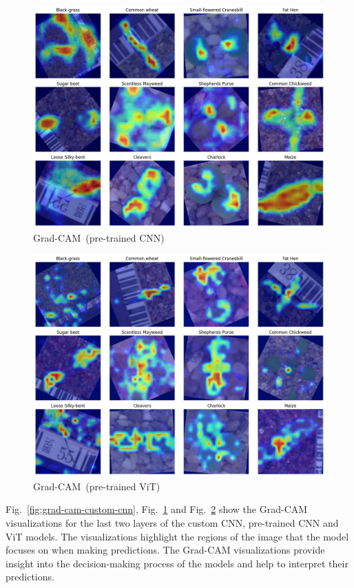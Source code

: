 \begin{figure}[htbp]
    \centerline{\includegraphics[width=0.9\linewidth]{../../resources/resnet/grad_cam.png}}
    \caption{Grad-CAM~(pre-trained CNN)}
    \label{fig:grad-cam-pretrained-cnn}
\end{figure}

\begin{figure}[htbp]
    \centerline{\includegraphics[width=0.9\linewidth]{../../resources/vit/grad_cam.png}}
    \caption{Grad-CAM~(pre-trained ViT)}
    \label{fig:grad-cam-pretrained-vit}
\end{figure}

Fig.~\ref{fig:grad-cam-custom-cnn}, Fig.~\ref{fig:grad-cam-pretrained-cnn} and Fig.~\ref{fig:grad-cam-pretrained-vit} show the Grad-CAM visualizations for the last two layers of the custom CNN, pre-trained CNN and ViT models. The visualizations highlight the regions of the image that the model focuses on when making predictions. The Grad-CAM visualizations provide insight into the decision-making process of the models and help to interpret their predictions.

